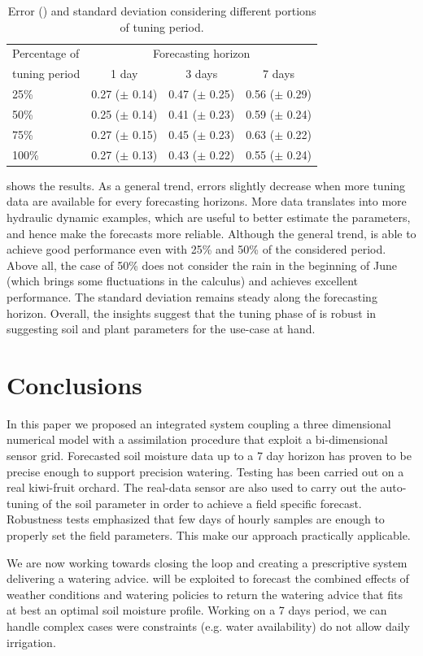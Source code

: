 \begin{table}[H]
\centering
\begin{tabular}{p{3cm}|ccc}
\toprule
Percentage of & \multicolumn{3}{c}{Forecasting horizon} \\
 tuning period & \multicolumn{1}{c|}{1 day} & \multicolumn{1}{c|}{3 days} & \multicolumn{1}{c}{7 days} \\ \midrule
25\%  & 0.27 ($\pm$ 0.14) & 0.47 ($\pm$ 0.25) & 0.56 ($\pm$ 0.29) \\
50\% & 0.25 ($\pm$ 0.14) & 0.41 ($\pm$ 0.23) & 0.59 ($\pm$ 0.24) \\
75\% & 0.27 ($\pm$ 0.15) & 0.45 ($\pm$ 0.23) & 0.63 ($\pm$ 0.22) \\
100\% & 0.27 ($\pm$ 0.13) & 0.43 ($\pm$ 0.22) & 0.55 ($\pm$ 0.24) \\ \bottomrule
\end{tabular}

\caption{Error () and standard deviation considering different portions of tuning period.}
\label{orchard-tbl:tuning_budget}
\end{table}

 shows the results. As a general trend, errors slightly decrease when more tuning data are available for every forecasting horizons. More data translates into more hydraulic dynamic examples, which are useful to better estimate the parameters, and hence make the forecasts more reliable.
%
Although the general trend, \olab{} is able to achieve good performance even with 25\% and 50\% of the considered period.
%
Above all, the case of 50\% does not consider the rain in the beginning of June (which brings some fluctuations in the calculus) and achieves excellent performance.
%
The standard deviation remains steady along the forecasting horizon.
%
Overall, the insights suggest that the tuning phase of \olab{} is robust in suggesting soil and plant parameters for the use-case at hand.

\section{Conclusions}
In this paper we proposed an integrated system coupling a three dimensional numerical model with a assimilation procedure that exploit a bi-dimensional sensor grid. Forecasted soil moisture data up to a 7 day horizon has proven to be precise enough to support precision watering. Testing has been carried out on a real kiwi-fruit orchard. The real-data sensor are also used to carry out the auto-tuning of the soil parameter in order to achieve a field specific forecast. Robustness tests emphasized that few days of hourly samples are enough to properly set the field parameters. This make our approach practically applicable. 

We are now working towards closing the loop and creating a prescriptive system delivering a watering advice. \olab{} will be exploited to forecast the combined effects of weather conditions and watering policies to return the watering advice that fits at best an optimal soil moisture profile.  Working on a 7 days period, we can handle complex cases were constraints (e.g. water availability) do not allow daily irrigation.
